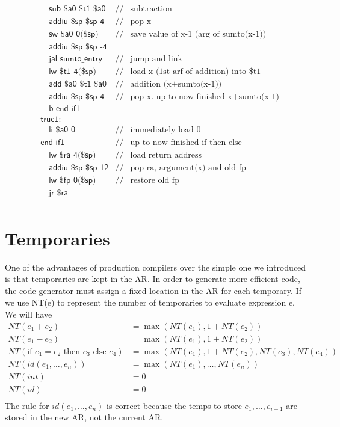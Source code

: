 \begin{align*}
&\quad\textsf{sub \$a0 \$t1 \$a0}&//&\text{subtraction}\\
&\quad\textsf{addiu \$sp \$sp 4}&//&\text{pop x}\\
&\quad\textsf{sw \$a0 0(\$sp)}&//&\text{save value of x-1 (arg of sumto(x-1))}\\
&\quad\textsf{addiu \$sp \$sp -4}\\
&\quad\textsf{jal sumto\_entry}&//&\text{jump and link}\\
&\quad\textsf{lw \$t1 4(\$sp)}&//&\text{load x (1st arf of addition) into \$t1}\\
&\quad\textsf{add \$a0 \$t1 \$a0}&//&\text{addition (x+sumto(x-1))}\\
&\quad\textsf{addiu \$sp \$sp 4}&//&\text{pop x. up to now finished x+sumto(x-1)}\\
&\quad\textsf{b end\_if1}&&\\
&\textsf{true1:}&&\\
&\quad\textsf{li \$a0 0}&//&\text{immediately load 0}\\
&\textsf{end\_if1}&//&\text{up to now finished if-then-else}\\
&\quad\textsf{lw \$ra 4(\$sp)}&//&\text{load return address}\\
&\quad\textsf{addiu \$sp \$sp 12}&//&\text{pop ra, argument(x) and old fp}\\
&\quad\textsf{lw \$fp 0(\$sp)}&//&\text{restore old fp}\\
&\quad\textsf{jr \$ra}&&\\
\end{align*}
\section{Temporaries}
One of the advantages of production compilers over the simple one we introduced is that temporaries are kept in the AR. In order to generate more efficient code, the code generator must assign a fixed location in the AR for each temporary. If we use NT(e) to represent the number of temporaries to evaluate expression e. We will have 
\begin{align*}
NT(e_1 + e_2)&=\max(NT(e_1), 1 + NT(e_2))\\
NT(e_1 - e_2)&=\max(NT(e_1), 1 + NT(e_2))\\
NT(\text{if }e_1 = e_2\text{ then }e_3\text{ else }e_4)&=\max(NT(e_1), 1 + NT(e_2), NT(e_3), NT(e_4))\\
NT(id(e_1,\dots,e_n))&=\max(NT(e_1),\dots,NT(e_n))\\
NT(int)&=0\\
NT(id)&=0\\
\end{align*}
The rule for $id(e_1,\dots,e_n)$ is correct because the temps to store $e_1,\dots,e_{i-1}$ are stored in the new AR, not the current AR. 

